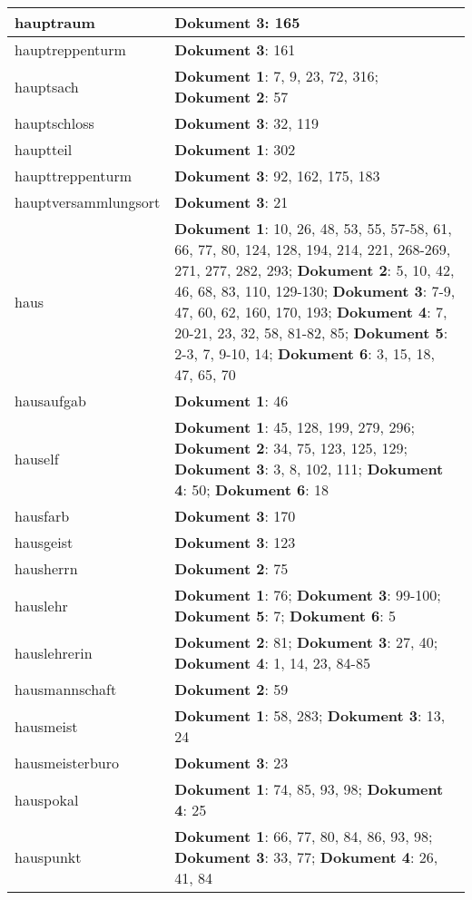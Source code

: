 \documentclass[a5paper]{article}
\begin{document}
\begin{longtable}[l]{|l|p{3in}|}
\hline
hauptraum & \textbf{Dokument 3}: 165 \\
\hline
hauptreppenturm & \textbf{Dokument 3}: 161 \\
\hline
hauptsach & \textbf{Dokument 1}: 7, 9, 23, 72, 316; \textbf{Dokument 2}: 57 \\
\hline
hauptschloss & \textbf{Dokument 3}: 32, 119 \\
\hline
hauptteil & \textbf{Dokument 1}: 302 \\
\hline
haupttreppenturm & \textbf{Dokument 3}: 92, 162, 175, 183 \\
\hline
hauptversammlungsort & \textbf{Dokument 3}: 21 \\
\hline
haus & \textbf{Dokument 1}: 10, 26, 48, 53, 55, 57-58, 61, 66, 77, 80, 124, 128, 194, 214, 221, 268-269, 271, 277, 282, 293; \textbf{Dokument 2}: 5, 10, 42, 46, 68, 83, 110, 129-130; \textbf{Dokument 3}: 7-9, 47, 60, 62, 160, 170, 193; \textbf{Dokument 4}: 7, 20-21, 23, 32, 58, 81-82, 85; \textbf{Dokument 5}: 2-3, 7, 9-10, 14; \textbf{Dokument 6}: 3, 15, 18, 47, 65, 70 \\
\hline
hausaufgab & \textbf{Dokument 1}: 46 \\
\hline
hauself & \textbf{Dokument 1}: 45, 128, 199, 279, 296; \textbf{Dokument 2}: 34, 75, 123, 125, 129; \textbf{Dokument 3}: 3, 8, 102, 111; \textbf{Dokument 4}: 50; \textbf{Dokument 6}: 18 \\
\hline
hausfarb & \textbf{Dokument 3}: 170 \\
\hline
hausgeist & \textbf{Dokument 3}: 123 \\
\hline
hausherrn & \textbf{Dokument 2}: 75 \\
\hline
hauslehr & \textbf{Dokument 1}: 76; \textbf{Dokument 3}: 99-100; \textbf{Dokument 5}: 7; \textbf{Dokument 6}: 5 \\
\hline
hauslehrerin & \textbf{Dokument 2}: 81; \textbf{Dokument 3}: 27, 40; \textbf{Dokument 4}: 1, 14, 23, 84-85 \\
\hline
hausmannschaft & \textbf{Dokument 2}: 59 \\
\hline
hausmeist & \textbf{Dokument 1}: 58, 283; \textbf{Dokument 3}: 13, 24 \\
\hline
hausmeisterburo & \textbf{Dokument 3}: 23 \\
\hline
hauspokal & \textbf{Dokument 1}: 74, 85, 93, 98; \textbf{Dokument 4}: 25 \\
\hline
hauspunkt & \textbf{Dokument 1}: 66, 77, 80, 84, 86, 93, 98; \textbf{Dokument 3}: 33, 77; \textbf{Dokument 4}: 26, 41, 84 \\

\end{longtable}
\end{document}
